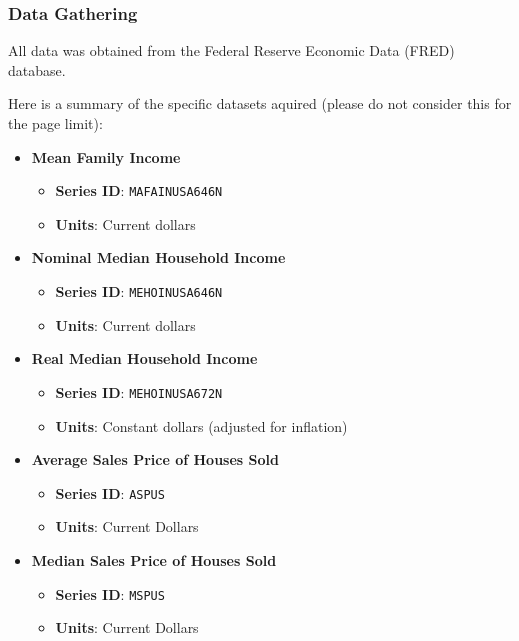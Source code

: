 \documentclass{article}
\begin{document}
\subsubsection{Data Gathering}

All data was obtained from the Federal Reserve Economic Data (FRED) database. 

Here is a summary of the specific datasets aquired (please do not consider this for the page limit):

\begin{itemize} 
    
    \item \textbf{Mean Family Income} 
    \begin{itemize} 
      \item \textbf{Series ID}: \texttt{MAFAINUSA646N} 
      \item \textbf{Units}: Current dollars 
    \end{itemize}
  
    \item \textbf{Nominal Median Household Income} 
    \begin{itemize} 
      \item \textbf{Series ID}: \texttt{MEHOINUSA646N} 
      \item \textbf{Units}: Current dollars 
    \end{itemize}

    \item \textbf{Real Median Household Income}
    \begin{itemize}
        \item \textbf{Series ID}: \texttt{MEHOINUSA672N}
        \item \textbf{Units}: Constant dollars (adjusted for inflation)
    \end{itemize}

    \item \textbf{Average Sales Price of Houses Sold}
    \begin{itemize}
        \item \textbf{Series ID}: \texttt{ASPUS}
        \item \textbf{Units}: Current Dollars
    \end{itemize}

    \item \textbf{Median Sales Price of Houses Sold}
    \begin{itemize}
        \item \textbf{Series ID}: \texttt{MSPUS}
        \item \textbf{Units}: Current Dollars
    \end{itemize}


\end{itemize}
\end{document}
